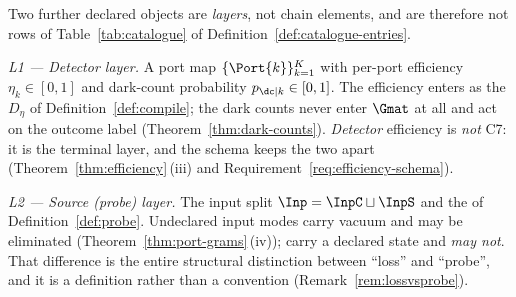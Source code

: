 
\begin{remark}\label{rem:layers}
Two further declared objects are \emph{layers}, not chain elements, and are
therefore not rows of Table~\ref{tab:catalogue} of
Definition~\ref{def:catalogue-entries}.

\emph{L1 --- Detector layer.} A port map $\{\Port{k}\}_{k=1}^{K}$ with
per-port efficiency $\eta_k\in[0,1]$ and dark-count probability
$p_{\dc|k}\in[0,1]$. The efficiency enters as the
 $D_\eta$ of
Definition~\ref{def:compile}; the dark counts never enter $\Gmat$ at all and
act on the outcome label (Theorem~\ref{thm:dark-counts}). \emph{Detector} efficiency
is \emph{not} C7: it is the terminal layer, and the schema keeps the two apart
(Theorem~\ref{thm:efficiency}\,(iii) and Requirement~\ref{req:efficiency-schema}).

\emph{L2 --- Source (probe) layer.} The input split
$\Inp=\InpC\sqcup\InpS$ and the  of
Definition~\ref{def:probe}. Undeclared input modes carry vacuum and may be
eliminated (Theorem~\ref{thm:port-grams}\,(iv));  carry a
declared state and \emph{may not}. That difference is the entire structural
distinction between ``loss'' and ``probe'', and it is a definition rather than
a convention (Remark~\ref{rem:lossvsprobe}).
\end{remark}
